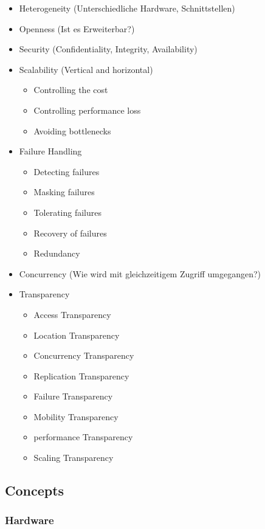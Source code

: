 \documentclass[a4paper]{article}
\begin{document}
\begin{itemize}
    \item Heterogeneity (Unterschiedliche Hardware, Schnittstellen)
    \item Openness (Ist es Erweiterbar?)
    \item Security (Confidentiality, Integrity, Availability)
    \item Scalability (Vertical and horizontal)
    \begin{itemize}
        \item Controlling the cost
        \item Controlling performance loss
        \item Avoiding bottlenecks
    \end{itemize}
    \item Failure Handling 
    \begin{itemize}
        \item Detecting failures
        \item Masking failures
        \item Tolerating failures
        \item Recovery of failures
        \item Redundancy
    \end{itemize}
    \item Concurrency (Wie wird mit gleichzeitigem Zugriff umgegangen?)
    \item Transparency
    \begin{itemize}
        \item Access Transparency
        \item Location Transparency
        \item Concurrency Transparency
        \item Replication Transparency
        \item Failure Transparency
        \item Mobility Transparency
        \item performance Transparency
        \item Scaling Transparency
    \end{itemize}
\end{itemize}

\subsection{Concepts}

\subsubsection{Hardware}
\end{document}
